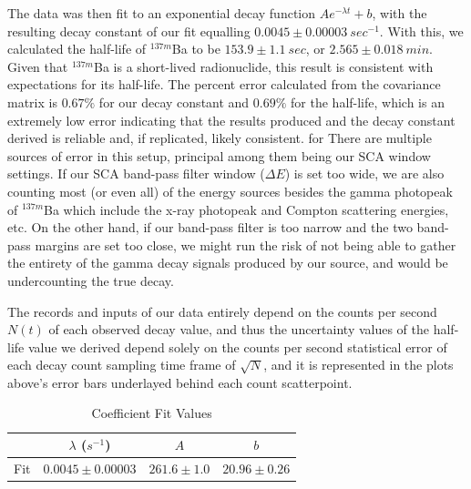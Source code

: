 \documentclass[10pt,letterpaper,onecolumn]{article}
\begin{document}
The data was then fit to an exponential decay function $Ae^{-\lambda t}+b$, with the resulting decay constant of our fit equalling $0.0045 \pm 0.00003\ sec^{-1}$. With this, we calculated the half-life of $^{137m}$Ba to be $153.9 \pm 1.1\ sec$, or $2.565 \pm 0.018\ min$. Given that $^{137m}$Ba is a short-lived radionuclide, this result is consistent with expectations for its half-life. The percent error calculated from the covariance matrix is $0.67\%$ for our decay constant and $0.69\%$ for the half-life, which is an extremely low error indicating that the results produced and the decay constant derived is reliable and, if replicated, likely consistent. for There are multiple sources of error in this setup, principal among them being our SCA window settings. If our SCA band-pass filter window ($\Delta E$) is set too wide, we are also counting most (or even all) of the energy sources besides the gamma photopeak of $^{137m}$Ba which include the x-ray photopeak and Compton scattering energies, etc. On the other hand, if our band-pass filter is too narrow and the two band-pass margins are set too close, we might run the risk of not being able to gather the entirety of the gamma decay signals produced by our source, and would be undercounting the true decay.

The records and inputs of our data entirely depend on the counts per second $N(t)$ of each observed decay value, and thus the uncertainty values of the half-life value we derived depend solely on the counts per second statistical error of each decay count sampling time frame of $\sqrt{N}$, and it is represented in the plots above's error bars underlayed behind each count scatterpoint.

%
%

\begin {table}[h]
{
{%
\begin {center}
\begin {tabular} {c | c | c | c }
\hline\hline
 & $\lambda$ ($s^{-1}$) & $A$ & $b$ \\
\hline
Fit	& $0.0045 \pm 0.00003$ & $261.6 \pm 1.0$ & $20.96 \pm 0.26$ \\

\hline%
\end {tabular}
\end {center}
}
}
\caption {\label{tab:events}
Coefficient Fit Values
 }
\end {table}
\end{document}
